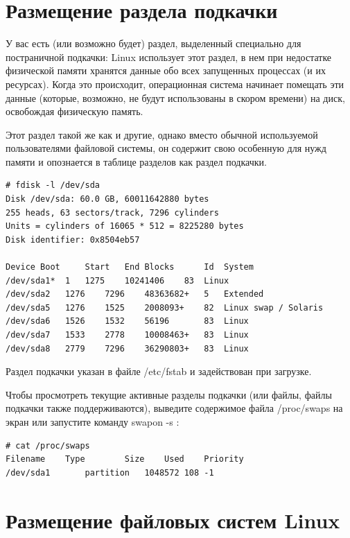 \documentclass[10pt]{book}
\begin{document}
\section{Размещение раздела подкачки}

У вас есть (или возможно будет) раздел, выделенный специально для постраничной подкачки: Linux использует этот раздел, в нем при недостатке физической памяти хранятся данные обо всех запущенных процессах (и их ресурсах). Когда это происходит, операционная система начинает помещать эти данные (которые, возможно, не будут использованы в скором времени) на диск, освобождая физическую память.

Этот раздел такой же как и другие, однако вместо обычной используемой пользователями файловой системы, он содержит свою особенную для нужд памяти и опознается в таблице разделов как раздел подкачки.

\vspace{3mm}
\begin{tcolorbox}
\begin{lstlisting}
# fdisk -l /dev/sda
Disk /dev/sda: 60.0 GB, 60011642880 bytes
255 heads, 63 sectors/track, 7296 cylinders
Units = cylinders of 16065 * 512 = 8225280 bytes
Disk identifier: 0x8504eb57

Device Boot 	Start 	End	Blocks		Id 	System
/dev/sda1* 	1 	1275 	10241406 	83 	Linux 
/dev/sda2 	1276 	7296 	48363682+ 	5 	Extended 
/dev/sda5 	1276 	1525 	2008093+ 	82 	Linux swap / Solaris 
/dev/sda6 	1526 	1532 	56196 		83 	Linux 
/dev/sda7 	1533 	2778 	10008463+ 	83 	Linux 
/dev/sda8 	2779 	7296 	36290803+ 	83 	Linux
\end{lstlisting} 
\end{tcolorbox}

Раздел подкачки указан в файле /etc/fstab и задействован при загрузке.

Чтобы просмотреть текущие активные разделы подкачки (или файлы, файлы подкачки также поддерживаются), выведите содержимое файла /proc/swaps на экран или запустите команду swapon -s :

\vspace{3mm}
\begin{tcolorbox}
\begin{lstlisting}
# cat /proc/swaps 
Filename	Type		Size	Used	Priority
/dev/sda1       partition	1048572	108	-1
\end{lstlisting}
\end{tcolorbox}

\section{Размещение файловых систем Linux}
\end{document}

